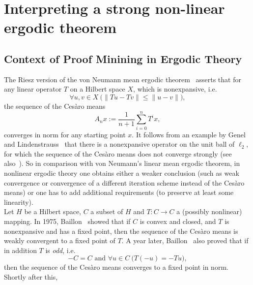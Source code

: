 \section{Interpreting a strong non-linear ergodic theorem}\label{s:Wittmann}

\subsection*{Context of Proof Minining in Ergodic Theory}

The Riesz version of the von Neumann mean ergodic theorem~\cite{Neumann1932} asserts that for any linear operator $T$ on a Hilbert space $X$, which is nonexpansive, i.e. 
\[
\forall u,v\in X\ \big(\|Tu-Tv\|\leq\|u-v\|\big),
\]
the sequence of the  Ces{\`a}ro means
\[
A_nx:=\frac{1}{n+1}\sum^{n}_{i=0} T^i x,
\]
converges in norm for any starting point $x$. 
It follows from an example 
by Genel and Lindenstrauss~\cite{Genel1975} that there is a nonexpansive operator on
the unit ball of $\ell_2$, for which the sequence of the  Ces{\`a}ro means does not converge strongly (see also~\cite{Krengel1985}).
So in comparison with von Neumann's linear mean ergodic theorem, in nonlinear ergodic theory 
one obtains either a weaker conclusion (such as weak convergence or convergence of a different
iteration scheme instead of the Ces{\`a}ro means) or one has to add additional requirements 
(to preserve at least some linearity).\\ 
Let $H$ be a Hilbert space, $C$ a subset of $H$ and
$T:C\to C$ a (possibly nonlinear) mapping. In 1975, Baillon~\cite{Baillon1975} showed  that if $C$ is convex and closed,
and $T$ is nonexpansive and has a fixed point, then the sequence of the Ces{\`a}ro means is weakly convergent to a fixed point of $T$.
A year later, Baillon~\cite{Baillon1976} also proved that if in addition $T$ is {\em odd}, i.e.
\[
-C = C\text{ and } \forall u\in C\ \big( T(-u)=-Tu\big),
\]
then the sequence of the Ces{\`a}ro means converges to a fixed point in norm. Shortly after this,
